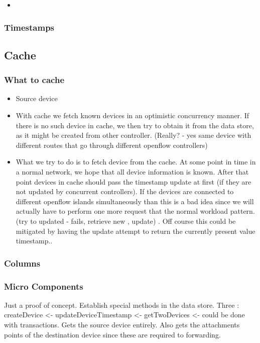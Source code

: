 {\begin{itemize}
\item 
\end{itemize}



\subsubsection{Timestamps}
\subsection{Cache}

\subsubsection{What to cache}
\begin{itemize}
\item Source device 

\item With cache we fetch known devices in an optimistic concurrency
manner.  If there is no such device in cache, we then try to obtain it
from the data store, as it might be created from other
controller. (Really? - yes same device with different routes that go
through different openflow controllers)

\item What we try to do is to fetch device from the cache. At some point in
time in a  normal network, we hope that all device information is
known. After that point devices in cache should pass the timestamp
update at first (if they are not updated by concurrent
controllers). If the devices are connected to different openflow
islands simultaneously than this is a bad idea since we will actually
have to perform one more request that the normal workload
pattern. (try to updated - fails, retrieve new , update) . Off course
this could be mitigated by having the update attempt to return the
currently present value timestamp..
\end{itemize}




\subsubsection{Columns}


\subsubsection{Micro Components}
Just a proof of concept. Establish special methods in the data store. 
Three : 
createDevice <-
updateDeviceTimestamp <- 
getTwoDevices <- could be done with transactions.  Gets the source
device entirely. Also gets the attachments points of the destination
device since these are required to forwarding. 

}
